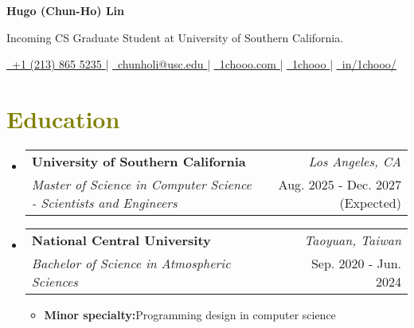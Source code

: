 \documentclass[a4paper, 11pt]{article}
\makeatletter
\newcommand{\cvSection}[1]{
    \section{\textcolor{olive}{\textbf{#1}}}
}
\newcommand{\subHeaderEntry}[4]{
\item[]
    \begin{tabular*}{0.98\textwidth}[t]{l@{\extracolsep{\fill}}r}
        \textbf{#1} & \textit{\footnotesize{#4}} \\
        \textit{\footnotesize{#3}} &  \footnotesize{#2}\\
    \end{tabular*}
    \vspace{-3.0mm}
}
\newcommand{\subHeaderStart}{
    \begin{itemize}[leftmargin=*,labelsep=0mm]
}
\newcommand{\subHeaderEnd}{
    \end{itemize}\vspace{-5.0mm}
}
\newcommand{\subHeaderItemStart}{
    \begin{justify}\begin{itemize}[
        leftmargin=3ex, 
        rightmargin=2ex, 
        noitemsep,
        labelsep=1.2mm,
        itemsep=0.5mm
    ]\small
}
\newcommand{\subHeaderItem}[2]{
  \item{
    \textbf{#1}{\hspace{1mm}#2}
  }
}
\newcommand{\subHeaderItemEnd}{
    \end{itemize}\end{justify}
}
\newcommand{\name}{Hugo (Chun-Ho) Lin} %
\newcommand{\phone}{+1 (213) 865 5235} %
\newcommand{\emaila}{chunholi@usc.edu} %
\newcommand{\announcement}{Incoming CS Graduate Student at University of Southern California.}
\makeatother
\begin{document}
\selectfont

\setlength{\footskip}{4.08003pt}

\begin{center}
    \textbf{\huge \name}
\end{center}

\begin{center}
    \announcement
\end{center}

\begin{center}
    \href{tel:+1-\phone}{
        \underline{
            \raisebox{0.0\height}{\footnotesize \faPhone}\
            {\phone}
        }
    } |
    \href{mailto:\emaila}{
        \underline{
            \raisebox{0.0\height}{\footnotesize \faEnvelope}\
            {\emaila}
        }
    } |
    \href{https://1chooo.com/}{
        \underline{
            \raisebox{0.0\height}{\footnotesize \faGlobe}\
            {1chooo.com}
        }
    } |
    \href{https://github.com/1chooo}{
        \underline{
            \raisebox{0.0\height}{\footnotesize \faGithub}\
            {1chooo}
        }
    } |
    \href{https://www.linkedin.com/in/1chooo/}{
        \underline{
            \raisebox{0.0\height}{\footnotesize \faLinkedin}\
            {in/1chooo/}
        }
    }
\end{center}


\cvSection{Education}
	\subHeaderStart
		
    \subHeaderEntry
        {University of Southern California}
        {Aug. 2025 - Dec. 2027 (Expected)}
        {Master of Science in Computer Science - Scientists and Engineers}
        {\textcolor{gray}{\footnotesize{\faMapMarker}} Los Angeles, CA}

        \subHeaderItemStart
        \subHeaderItemEnd
		
    \subHeaderEntry
        {National Central University}
        {Sep. 2020 - Jun. 2024}
        {Bachelor of Science in Atmospheric Sciences}
        {\textcolor{gray}{\footnotesize{\faMapMarker}} Taoyuan, Taiwan}
		
        \subHeaderItemStart
            \subHeaderItem{Minor specialty:}{Programming design in computer science}
        \subHeaderItemEnd
		  
	\subHeaderEnd

\end{document}
